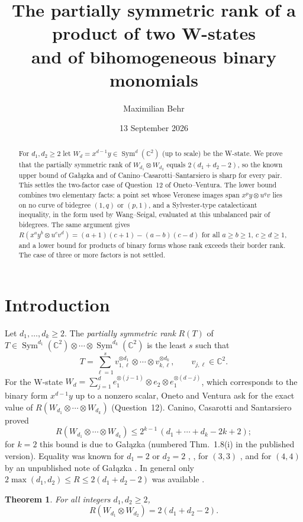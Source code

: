 \documentclass[11pt]{amsart}
\title[Partially symmetric rank of two W-states]{The partially symmetric rank of a product of two W-states\\ and of bihomogeneous binary monomials}
\author{Maximilian Behr}
\date{13 September 2026}
\newtheorem{theorem}{Theorem}[section]
\theoremstyle{remark}
\newcommand{\C}{\mathbb{C}}
\DeclareMathOperator{\Sym}{Sym}
\begin{document}
\begin{abstract}
For $d_1,d_2\ge 2$ let $W_d=x^{d-1}y\in\Sym^d(\C^2)$ (up to scale) be the W-state. We prove that the partially symmetric rank of $W_{d_1}\otimes W_{d_2}$ equals $2(d_1+d_2-2)$, so the known upper bound of Ga{\l}\k{a}zka and of Canino--Casarotti--Santarsiero is sharp for every pair. This settles the two-factor case of Question~12 of Oneto--Ventura. The lower bound combines two elementary facts: a point set whose Veronese images span $x^py\otimes u^qv$ lies on no curve of bidegree $(1,q)$ or $(p,1)$, and a Sylvester-type catalecticant inequality, in the form used by Wang--Seigal, evaluated at this unbalanced pair of bidegrees. The same argument gives $R(x^ay^b\otimes u^cv^d)=(a+1)(c+1)-(a-b)(c-d)$ for all $a\ge b\ge1$, $c\ge d\ge1$, and a lower bound for products of binary forms whose rank exceeds their border rank. The case of three or more factors is not settled.
\end{abstract}

\maketitle

\section{Introduction}

Let $d_1,\dots,d_k\ge 2$. The \emph{partially symmetric rank} $R(T)$ of $T\in\Sym^{d_1}(\C^2)\otimes\cdots\otimes\Sym^{d_k}(\C^2)$ is the least $s$ such that
\[
T=\sum_{\ell=1}^{s} v_{1,\ell}^{\otimes d_1}\otimes\cdots\otimes v_{k,\ell}^{\otimes d_k},\qquad v_{j,\ell}\in\C^2 .
\]
For the W-state $W_d=\sum_{j=1}^d e_1^{\otimes(j-1)}\otimes e_2\otimes e_1^{\otimes(d-j)}$, which corresponds to the binary form $x^{d-1}y$ up to a nonzero scalar, Oneto and Ventura \cite{OV} ask for the exact value of $R(W_{d_1}\otimes\cdots\otimes W_{d_k})$ (Question~12). Canino, Casarotti and Santarsiero \cite{CCS} proved
\[
R(W_{d_1}\otimes\cdots\otimes W_{d_k})\le 2^{k-1}\,(d_1+\cdots+d_k-2k+2);
\]
for $k=2$ this bound is due to Ga{\l}\k{a}zka \cite[Thm.~1.5(i)]{Gal} (numbered Thm.~1.8(i) in the published version). Equality was known for $d_1=2$ or $d_2=2$ \cite[Prop.~4.4]{BBCG}, \cite[Thm.~1.5(ii)]{Gal}, for $(3,3)$ \cite[Prop.~4.2]{BBCG}, and for $(4,4)$ by an unpublished note of Ga{\l}\k{a}zka \cite{GalNote}. In general only $2\max(d_1,d_2)\le R\le 2(d_1+d_2-2)$ was available \cite{Gal,BBGO}.

\begin{theorem}\label{thm:main}
For all integers $d_1,d_2\ge 2$,
\[
R(W_{d_1}\otimes W_{d_2}) = 2(d_1+d_2-2).
\]
\end{theorem}
\end{document}
